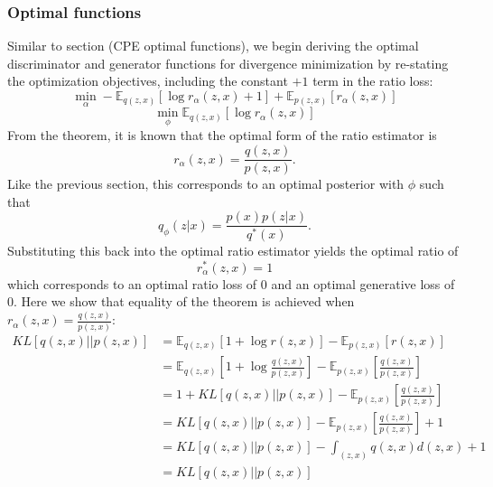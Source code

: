 \documentclass[a4paper,12pt]{article}
\newcommand{\E}{\mathbb{E}}
\numberwithin{equation}{section}
\begin{document}
\subsubsection{Optimal functions}
Similar to section (CPE optimal functions), we begin deriving the optimal discriminator and generator functions for divergence minimization by re-stating the optimization objectives, including the constant $+1$ term in the ratio loss:
\[\min_\alpha-\mathbb{E}_{q(z,x)}[\log r_\alpha(z,x)+1]+\mathbb{E}_{p(z,x)}[r_\alpha(z,x)]\]
\[\min_\phi \mathbb{E}_{q(z,x)}[\log r_\alpha (z,x)]\]
From the theorem, it is known that the optimal form of the ratio estimator is
\[r_\alpha(z,x)=\frac{q(z,x)}{p(z,x)}.\]
Like the previous section, this corresponds to an optimal posterior with $\phi$ such that
\[q_\phi(z|x)=\frac{p(x)p(z|x)}{q^*(x)}.\]
Substituting this back into the optimal ratio estimator yields the optimal ratio of
\[r_\alpha^*(z,x)=1\]
which corresponds to an optimal ratio loss of $0$ and an optimal generative loss of $0$.
Here we show that equality of the theorem is achieved when $r_\alpha(z,x)=\frac{q(z,x)}{p(z,x)}$:
\begin{align*}
KL[q(z,x)||p(z,x)]&=\E_{q(z,x)}[1+\log r(z,x)]-\E_{p(z,x)}[r(z,x)]\\
&=\E_{q(z,x)}\left[1+\log \frac{q(z,x)}{p(z,x)}\right]-\E_{p(z,x)}\left[\frac{q(z,x)}{p(z,x)}\right]\\
&=1+KL[q(z,x)||p(z,x)]-\E_{p(z,x)}\left[\frac{q(z,x)}{p(z,x)}\right]\\
&=KL[q(z,x)||p(z,x)]-\E_{p(z,x)}\left[\frac{q(z,x)}{p(z,x)}\right]+1\\
&=KL[q(z,x)||p(z,x)]-\int_{(z,x)}q(z,x)d(z,x)+1\\
&=KL[q(z,x)||p(z,x)]
\end{align*}
\newpage
\end{document}
